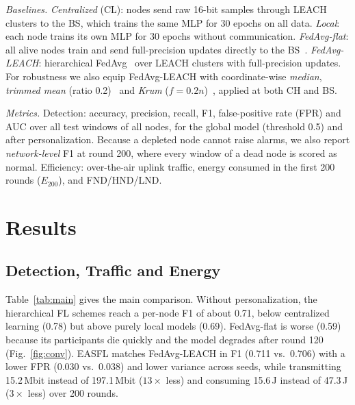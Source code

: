 \documentclass[journal,onecolumn,draftclsnofoot,12pt]{IEEEtran}
\begin{document}
\textit{Baselines.} \emph{Centralized} (CL): nodes send raw 16-bit samples through LEACH clusters to the BS, which trains the same MLP for 30 epochs on all data. \emph{Local}: each node trains its own MLP for 30 epochs without communication. \emph{FedAvg-flat}: all alive nodes train and send full-precision updates directly to the BS~\cite{mcmahan2017}. \emph{FedAvg-LEACH}: hierarchical FedAvg~\cite{liu2020hfl} over LEACH clusters with full-precision updates. For robustness we also equip FedAvg-LEACH with coordinate-wise \emph{median}, \emph{trimmed mean} (ratio 0.2)~\cite{yin2018} and \emph{Krum} ($f=0.2n$)~\cite{blanchard2017}, applied at both CH and BS.

\textit{Metrics.} Detection: accuracy, precision, recall, F1, false-positive rate (FPR) and AUC over all test windows of all nodes, for the global model (threshold 0.5) and after personalization. Because a depleted node cannot raise alarms, we also report \emph{network-level} F1 at round 200, where every window of a dead node is scored as normal. Efficiency: over-the-air uplink traffic, energy consumed in the first 200 rounds ($E_{200}$), and FND/HND/LND.

\section{Results}\label{sec:results}
\subsection{Detection, Traffic and Energy}
Table~\ref{tab:main} gives the main comparison. Without personalization, the hierarchical FL schemes reach a per-node F1 of about 0.71, below centralized learning (0.78) but above purely local models (0.69). FedAvg-flat is worse (0.59) because its participants die quickly and the model degrades after round 120 (Fig.~\ref{fig:conv}). EASFL matches FedAvg-LEACH in F1 (0.711 vs.\ 0.706) with a lower FPR (0.030 vs.\ 0.038) and lower variance across seeds, while transmitting 15.2\,Mbit instead of 197.1\,Mbit ($13\times$ less) and consuming 15.6\,J instead of 47.3\,J ($3\times$ less) over 200 rounds.
\end{document}
